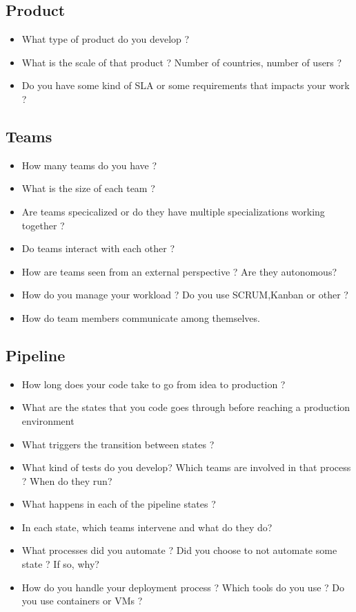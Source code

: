     \subsection*{Product}
        \begin{itemize}
            \item What type of product do you develop ?
            \item What is the scale of that product ? Number of countries, number of users ?
            \item Do you have some kind of SLA or some requirements that impacts your work ?
    \end{itemize}
    \subsection*{Teams}
        \begin{itemize}
            \item How many teams do you have ?
            \item What is the size of each team ?
            \item Are teams specicalized or do they have multiple specializations working together ?
            \item Do teams interact with each other ?
            \item How are teams seen from an external perspective ? Are they autonomous?
            \item How do you manage your workload ? Do you use SCRUM,Kanban or other ?
            \item How do team members communicate among themselves.
    \end{itemize}
    \subsection*{Pipeline}
  	    \begin{itemize}
            \item How long does your code take to go from idea to production ?
            \item What are the states that you code goes through before reaching a production environment
            \item What triggers the transition between states ?
            \item What kind of tests do you develop? Which teams are involved in that process ? When do they run?
            \item What happens in each of the pipeline states ?
            \item In each state, which teams intervene and what do they do?
            \item What processes did you automate ? Did you choose to not automate some state ? If so, why?
            \item How do you handle your deployment process ? Which tools do you use ? Do you use containers or VMs ?
    \end{itemize}
